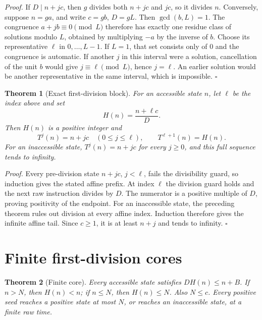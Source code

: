 \documentclass[11pt,letterpaper]{article}
\newtheorem{theorem}{Theorem}
\newenvironment{proof}{\noindent\textit{Proof.}}{\hfill\(\square\)}
\begin{document}
\begin{proof}
If \(D\mid n+jc\), then \(g\) divides both \(n+jc\) and \(jc\), so it
divides \(n\). Conversely, suppose \(n=ga\), and write \(c=gb\), \(D=gL\).
Then \(\gcd(b,L)=1\). The congruence \(a+jb\equiv0\pmod L\) therefore
has exactly one residue class of solutions modulo \(L\), obtained by
multiplying \(-a\) by the inverse of \(b\). Choose its representative
\(\ell\) in \(0,\ldots,L-1\). If \(L=1\), that set consists only of
\(0\) and the congruence is automatic. If another \(j\) in this interval
were a solution, cancellation of the unit \(b\) would give
\(j\equiv\ell\pmod L\), hence \(j=\ell\). An earlier solution would
be another representative in the same interval, which is impossible.
\end{proof}

\begin{theorem}[Exact first-division block]
For an accessible state \(n\), let \(\ell\) be the index above and set
\[
 H(n)=\frac{n+\ell c}{D}.
\]
Then \(H(n)\) is a positive integer and
\[
 T^j(n)=n+jc\quad(0\leq j\leq\ell),\qquad
 T^{\ell+1}(n)=H(n).
\]
For an inaccessible state, \(T^j(n)=n+jc\) for every \(j\geq0\), and this
full sequence tends to infinity.
\end{theorem}

\begin{proof}
Every pre-division state \(n+jc\), \(j<\ell\), fails the divisibility guard,
so induction gives the stated affine prefix. At index \(\ell\) the division
guard holds and the next raw instruction divides by \(D\). The numerator
is a positive multiple of \(D\), proving positivity of the endpoint.
For an inaccessible state, the preceding theorem rules out division at every
affine index. Induction therefore gives the infinite affine tail. Since
\(c\geq1\), it is at least \(n+j\) and tends to infinity.
\end{proof}

\section{Finite first-division cores}

\begin{theorem}[Finite core]
Every accessible state satisfies \(D H(n)\leq n+B\). If \(n>N\), then
\(H(n)<n\); if \(n\leq N\), then \(H(n)\leq N\). Also \(N\leq c\).
Every positive seed reaches a positive state at most \(N\), or reaches an
inaccessible state, at a finite raw time.
\end{theorem}
\end{document}
